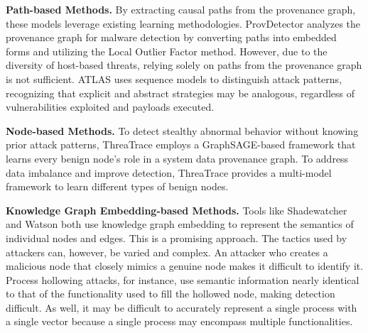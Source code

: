 \noindent
{\bf Path-based Methods.} By extracting causal paths from the provenance graph, these models leverage existing learning methodologies. ProvDetector \cite{wang2020you} analyzes the provenance graph for malware detection by converting paths into embedded forms and utilizing the Local Outlier Factor method. However, due to the diversity of host-based threats, relying solely on paths from the provenance graph is not sufficient. ATLAS \cite{alsaheel2021atlas}uses sequence models to distinguish attack patterns, recognizing that explicit and abstract strategies may be analogous, regardless of vulnerabilities exploited and payloads executed.

\noindent
{\bf Node-based Methods.} To detect stealthy abnormal behavior without knowing prior attack patterns, ThreaTrace\cite{wang2022threatrace} employs a GraphSAGE-based framework that learns every benign node's role in a system data provenance graph. To address data imbalance and improve detection, ThreaTrace provides a multi-model framework to learn different types of benign nodes.

\noindent
{\bf Knowledge Graph Embedding-based Methods.} Tools like Shadewatcher\cite{zengy2022shadewatcher} and Watson\cite{zeng2021watson} both use knowledge graph embedding to represent the semantics of individual nodes and edges. This is a promising approach. The tactics used by attackers can, however, be varied and complex. An attacker who creates a malicious node that closely mimics a genuine node makes it difficult to identify it. Process hollowing attacks, for instance, use semantic information nearly identical to that of the functionality used to fill the hollowed node, making detection difficult. As well, it may be difficult to accurately represent a single process with a single vector because a single process may encompass multiple functionalities.



